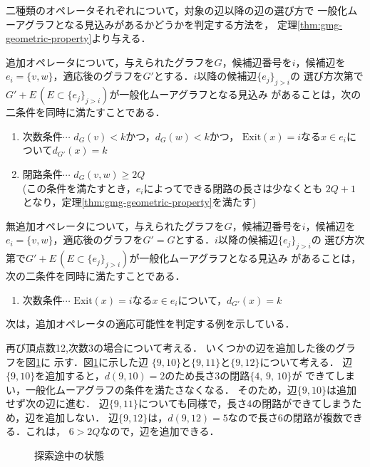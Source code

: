 二種類のオペレータそれぞれについて，対象の辺以降の辺の選び方で
一般化ムーアグラフとなる見込みがあるかどうかを判定する方法を，
定理\ref{thm:gmg-geometric-property}より与える．
\begin{corollary-without-proof}
  \label{coll:basic-add-operator}
  追加オペレータについて，与えられたグラフを$G$，候補辺番号を$i$，候補辺を
  $e_i=\{v,w\}$，適応後のグラフを$G'$とする．$i$以降の候補辺$\{e_j\}_{j>i}$の
  選び方次第で$G'+E\,(E\subset \{e_j\}_{j>i})$が一般化ムーアグラフとなる見込み
  があることは，次の二条件を同時に満たすことである．
  \begin{enumerate}
  \item 次数条件$\cdots$ $d_G(v)<k$かつ，$d_G(w)<k$かつ，
    $\text{Exit}(x)=i$なる$x\in e_i$について$d_{G'}(x)=k$
  \item 閉路条件$\cdots$ $d_G(v,w)\geq2Q$\\
    (この条件を満たすとき，$e_i$によってできる閉路の長さは少なくとも
    $2Q+1$となり，定理\ref{thm:gmg-geometric-property}を満たす)
  \end{enumerate}
\end{corollary-without-proof}
\begin{corollary-without-proof}
  \label{coll:basic-noadd-operator}
  無追加オペレータについて，与えられたグラフを$G$，候補辺番号を$i$，候補辺を
  $e_i=\{v,w\}$，適応後のグラフを$G'=G$とする．$i$以降の候補辺$\{e_j\}_{j>i}$の
  選び方次第で$G'+E\,(E\subset \{e_j\}_{j>i})$が一般化ムーアグラフとなる見込み
  があることは，次の二条件を同時に満たすことである．
  \begin{enumerate}
  \item 次数条件$\cdots$ $\text{Exit}(x)=i$なる$x\in e_i$について，$d_{G'}(x)=k$
  \end{enumerate}
\end{corollary-without-proof}
次は，追加オペレータの適応可能性を判定する例を示している．
\begin{example}
  再び頂点数12,次数3の場合について考える．
  いくつかの辺を追加した後のグラフを図\ref{fig:feasible-edges-example2}に
  示す．図\ref{fig:feasible-edges-example2}に示した辺
  $\{9,10\}$と$\{9,11\}$と$\{9,12\}$について考える．
  辺$\{9,10\}$を追加すると，$d(9,10)=2$のため長さ3の閉路$\{4,\,9,\,10\}$が
  できてしまい，一般化ムーアグラフの条件を満たさなくなる．
  そのため，辺$\{9,10\}$は追加せず次の辺に進む．
  辺$\{9,11\}$についても同様で，長さ4の閉路ができてしまうため，辺を追加しない．
  辺$\{9,12\}$は，$d(9,12)=5$なので長さ6の閉路が複数できる．これは，
  $6>2Q$なので，辺を追加できる．
\end{example}
\begin{figure}
  \centering
  \def\svgwidth{.35\textwidth}
  
  \caption{探索途中の状態}
  \label{fig:feasible-edges-example2}
\end{figure}

